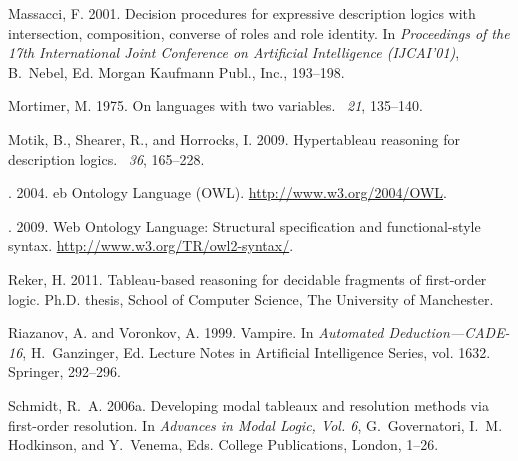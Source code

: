 \documentclass[leqno
,pdflatex
,prodmode
,acmtocl
]{acmsmall}
\begin{document}
\begin{thebibliography}{}
{\sc Massacci, F.} 2001.
\newblock Decision procedures for expressive description logics with
  intersection, composition, converse of roles and role identity.
\newblock In {\em Proceedings of the 17th International Joint Conference on
  Artificial Intelligence ({IJCAI}'01)}, {B.~Nebel}, Ed. Morgan Kaufmann Publ.,
  Inc., 193--198.

{\sc Mortimer, M.} 1975.
\newblock On languages with two variables.
~{\em 21}, 135--140.

{\sc Motik, B.}, {\sc Shearer, R.}, {\sc and} {\sc Horrocks, I.} 2009.
\newblock Hypertableau reasoning for description logics.
~{\em 36},
  165--228.

{}. 2004.
eb {O}ntology {L}anguage ({OWL}).
\newblock \url{http://www.w3.org/2004/OWL}.

{}. 2009.
 {W}eb {O}ntology {L}anguage: Structural specification and
  functional-style syntax.
\newblock \url{http://www.w3.org/TR/owl2-syntax/}.

{\sc Reker, H.} 2011.
\newblock Tableau-based reasoning for decidable fragments of first-order logic.
\newblock Ph.D. thesis, School of Computer Science, The University of
  Manchester.

{\sc Riazanov, A.} {\sc and} {\sc Voronkov, A.} 1999.
\newblock Vampire.
\newblock In {\em Automated Deduction---CADE-16}, {H.~Ganzinger}, Ed. Lecture
  Notes in Artificial Intelligence Series, vol. 1632. Springer, 292--296.

{\sc Schmidt, R.~A.} 2006a.
\newblock Developing modal tableaux and resolution methods via first-order
  resolution.
\newblock In {\em Advances in Modal Logic, Vol. 6}, {G.~Governatori}, {I.~M.
  Hodkinson}, {and} {Y.~Venema}, Eds. College Publications, London, 1--26.


\end{thebibliography}
\end{document}
